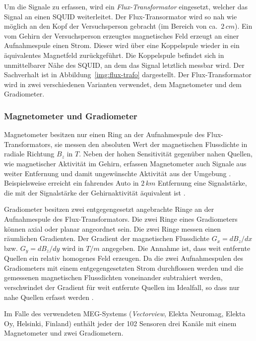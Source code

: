 \documentclass[doc,a4paper,12pt]{apa6}
\begin{document}
Um die Signale zu erfassen, wird ein \emph{Flux-Transformator} eingesetzt, welcher das Signal an einen SQUID weiterleitet. Der Flux-Transormator wird so nah wie möglich an den Kopf der Versuchsperson gebracht (im Bereich von ca.~$2\,cm$). Ein vom Gehirn der Versuchsperson erzeugtes magnetisches Feld erzeugt an einer Aufnahmespule einen Strom. Dieser wird über eine Koppelspule wieder in ein äquivalentes Magnetfeld zurückgeführt. Die Koppelspule befindet sich in unmittelbarer Nähe des SQUID, an dem das Signal letztlich messbar wird. Der Sachverhalt ist in Abbildung~\ref{img:flux-trafo} dargestellt. Der Flux-Transformator wird in zwei verschiedenen Varianten verwendet, dem Magnetometer und dem Gradiometer.

\subsubsection{Magnetometer und Gradiometer}

Magnetometer besitzen nur einen Ring an der Aufnahmespule des Flux-Transformators, sie messen den absoluten Wert der magnetischen Flussdichte in radiale Richtung $B_z$ in $T$. Neben der hohen Sensitivität gegenüber nahen Quellen, wie magnetischer Aktivität im Gehirn, erfassen Magnetometer auch Signale aus weiter Entfernung und damit ungewünschte Aktivität aus der Umgebung \parencite{hansen2010meg}. Beispielsweise erreicht ein fahrendes Auto in $2\,km$ Entfernung eine Signalstärke, die mit der Signalstärke der Gehirnaktivität äquivalent ist \parencite{weinstock2012squid}.

Gradiometer besitzen zwei entgegengesetzt angebrachte Ringe an der Aufnahmespule des Flux-Transformators. Die zwei Ringe eines Gradiometers können axial oder planar angeordnet sein. Die zwei Ringe messen einen räumlichen Gradienten. Der Gradient der magnetischen Flussdichte $G_x = dB_z/dx$ bzw. $G_y = dB_z/dy$ wird in $T/m$ angegeben. Die Annahme ist, dass weit entfernte Quellen ein relativ homogenes Feld erzeugen. Da die zwei Aufnahmespulen des Gradiometers mit einem entgegengesetzten Strom durchflossen werden und die gemessenen magnetischen Flussdichten voneinander subtrahiert werden, verschwindet der Gradient für weit entfernte Quellen im Idealfall, so dass nur nahe Quellen erfasst werden \parencite{hansen2010meg}.

Im Falle des verwendeten MEG-Systems (\emph{Vectorview}, Elekta Neuromag, Elekta Oy, Helsinki, Finland) enthält jeder der 102 Sensoren drei Kanäle mit einem Magnetometer und zwei Gradiometern.
\end{document}
